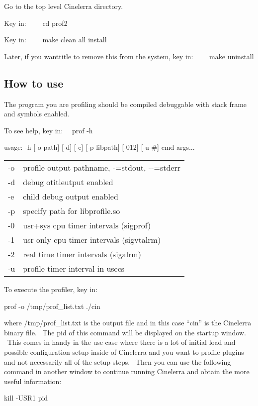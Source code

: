 Go to the top level Cinelerra directory.

Key in: \ \ \ \ cd prof2

Key in: \ \ \ \ make clean all install

Later, if you wanttitle to remove this from the system, key in: \ \ \ \ make uninstall
\subsection{How to use}

The program you are profiling should be compiled debuggable with stack frame and symbols enabled.
\medskip

To see help, key in: \ \ prof -h
\smallskip

usage: -h [-o path] [-d] [-e] [-p libpath] [-012] [-u \#] cmd args...

\hspace{2em}
\begin{tabular}{@{}ll}
	-o & profile output pathname, -=stdout, -{}-=stderr\\
	-d & debug otitleutput enabled\\
	-e & child debug output enabled\\
	-p & specify path for libprofile.so\\
	-0 & usr+sys cpu timer intervals (sigprof)\\
	-1 & usr only cpu timer intervals (sigvtalrm)\\
	-2 & real time timer intervals (sigalrm)\\
	-u & profile timer interval in usecs\\
\end{tabular}
\medskip

To execute the profiler, key in: \ \ 
\medskip

\hspace{2em}prof -o /tmp/prof\_list.txt ./cin
\medskip

where /tmp/prof\_list.txt is the output file and in this case ``cin'' is the Cinelerra binary file. \ The pid of this command will be displayed on the startup window. \ This comes in handy in the use case where there is a lot of initial load and possible configuration setup inside of Cinelerra and you want to profile plugins and not necessarily all of the setup steps. \ Then you can use the following command in another window to continue running Cinelerra and obtain the more useful information:
\medskip

\hspace{2em}kill -USR1 pid
\medskip

